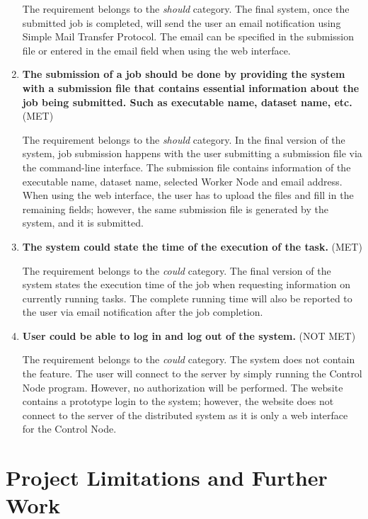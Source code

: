 \documentclass[10pt]{report}
\begin{document}
\begin{enumerate}
    The requirement belongs to the \textit{should} category. The final system, once the submitted job is completed, will send the user an email notification using Simple Mail Transfer Protocol. The email can be specified in the submission file or entered in the email field when using the web interface.

    \item \textbf{The submission of a job should be done by providing the system with a submission file that contains essential information about the job being submitted. Such as executable name, dataset name, etc.} (MET)

    The requirement belongs to the \textit{should} category. In the final version of the system, job submission happens with the user submitting a submission file via the command-line interface. The submission file contains information of the executable name, dataset name, selected Worker Node and email address. When using the web interface, the user has to upload the files and fill in the remaining fields; however, the same submission file is generated by the system, and it is submitted.

    \item \textbf{The system could state the time of the execution of the task.} (MET)

    The requirement belongs to the \textit{could} category. The final version of the system states the execution time of the job when requesting information on currently running tasks. The complete running time will also be reported to the user via email notification after the job completion.

    \item \textbf{User could be able to log in and log out of the system.} (NOT MET)

    The requirement belongs to the \textit{could} category. The system does not contain the feature. The user will connect to the server by simply running the Control Node program. However, no authorization will be performed. The website contains a prototype login to the system; however, the website does not connect to the server of the distributed system as it is only a web interface for the Control Node.

\end{enumerate}

\section{Project Limitations and Further Work}
\end{document}
